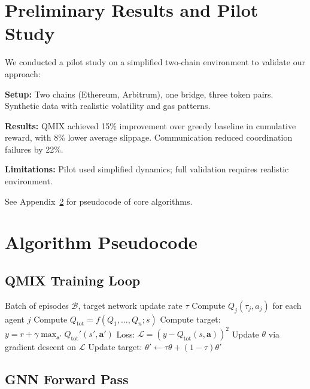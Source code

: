 \documentclass[11pt,a4paper]{article}
\begin{document}
\section{Preliminary Results and Pilot Study}\label{sec:preliminary}

We conducted a pilot study on a simplified two-chain environment to validate our approach:

\textbf{Setup:} Two chains (Ethereum, Arbitrum), one bridge, three token pairs. Synthetic data with realistic volatility and gas patterns.

\textbf{Results:} QMIX achieved 15\% improvement over greedy baseline in cumulative reward, with 8\% lower average slippage. Communication reduced coordination failures by 22\%.

\textbf{Limitations:} Pilot used simplified dynamics; full validation requires realistic environment.

See Appendix~\ref{app:pseudocode} for pseudocode of core algorithms.

\newpage


\newpage
\appendix
\section{Algorithm Pseudocode}\label{app:pseudocode}

\subsection{QMIX Training Loop}

\begin{algorithm}[H]
\caption{QMIX for Cross-Chain DeFi}
\begin{algorithmic}[1]
\Require Batch of episodes $\mathcal{B}$, target network update rate $\tau$
    \State Compute $Q_j(\tau_j, a_j)$ for each agent $j$
    \State Compute $Q_{\text{tot}} = f(Q_1, \ldots, Q_n; s)$
    \State Compute target: $y = r + \gamma \max_{\mathbf{a}'} Q_{\text{tot}}'(s', \mathbf{a}')$
    \State Loss: $\mathcal{L} = (y - Q_{\text{tot}}(s, \mathbf{a}))^2$
    \State Update $\theta$ via gradient descent on $\mathcal{L}$
\EndFor
\State Update target: $\theta' \leftarrow \tau \theta + (1-\tau) \theta'$
\end{algorithmic}
\end{algorithm}

\subsection{GNN Forward Pass}
\end{document}
